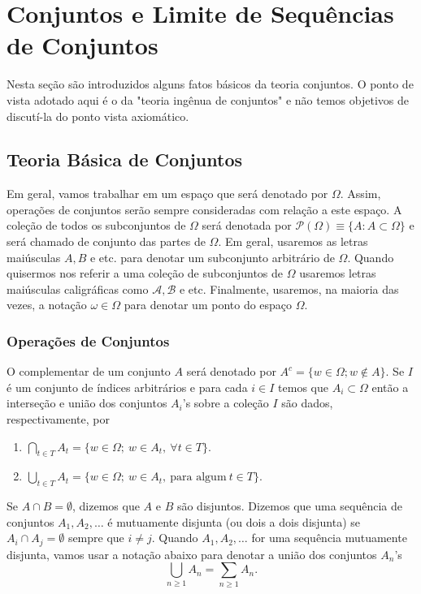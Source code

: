 \chapter[Aula 1]{Conjuntos e Limite de Sequências de Conjuntos}
\chaptermark{}

Nesta seção são introduzidos alguns fatos básicos da teoria
conjuntos. O ponto de vista adotado aqui é o da "teoria ingênua
de conjuntos" e não temos objetivos de discutí-la do ponto 
vista axiomático.

  
\section{Teoria Básica de Conjuntos}


Em geral, vamos trabalhar em um espaço que será denotado 
por $\Omega$. Assim, operações de conjuntos serão sempre 
consideradas com relação a este espaço. 
A coleção de todos os subconjuntos de $\Omega$ será 
denotada por $\mathcal{P}(\Omega)\equiv \{A: A\subset \Omega\}$ e 
será chamado de conjunto das partes de $\Omega$.
Em geral, usaremos as letras maiúsculas $A,B$ e etc. para denotar
um subconjunto arbitrário de $\Omega$. Quando quisermos nos referir
a uma coleção de subconjuntos de $\Omega$ usaremos letras maiúsculas 
caligráficas como $\mathcal{A}, \mathcal{B}$ e etc. Finalmente,
usaremos, na maioria das vezes, a notação $\omega\in\Omega$ 
para denotar um ponto do espaço $\Omega$.




\subsection{Operações de Conjuntos}

O complementar de um conjunto $A$ será 
denotado por $A^{c}= \{w \in \Omega; w \notin A\}$. 
Se $I$ é um conjunto de índices arbitrários e 
para cada $i\in I$ temos que $A_i\subset \Omega$ então 
a interseção e união dos conjuntos $A_i$'s sobre a coleção
$I$ são dados, respectivamente, por 
\begin{enumerate}
	\item[]  $\displaystyle\bigcap_{t \in T}{A_t}
							= 
						\{ w \in \Omega;\ w \in A_t,\ \forall t \in T\}$.
	\item[]  $\displaystyle\bigcup_{t \in T}{A_t}
							= 
						\{ w \in \Omega;\ w \in A_t,\ \text{para algum}\ t \in T \}$.
\end{enumerate}
%
%
%
Se $A \cap B = \emptyset$, dizemos que $A$ e $B$ são disjuntos.
Dizemos que uma sequência de conjuntos 
$A_1, A_2,\ldots$ é mutuamente disjunta (ou dois a dois disjunta) 
se $A_i \cap A_j = \emptyset$ sempre que $i \neq j$. 
Quando $A_1,A_2,\ldots $ for uma sequência mutuamente disjunta, 
vamos usar a notação abaixo para denotar a união dos conjuntos $A_n$'s
\[
	\displaystyle\bigcup_{n \geqslant 1}{A_n} = \sum_{n \geqslant 1} A_n.	
\]

